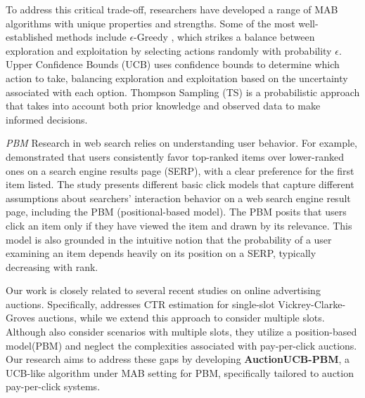 To address this critical trade-off, researchers have developed a range of MAB algorithms with unique properties and strengths. Some of the most well-established methods include $\epsilon$-Greedy \cite{auer2002finite}, which strikes a balance between exploration and exploitation by selecting actions randomly with probability $\epsilon$. Upper Confidence Bounds (UCB) \cite{auer2002using} uses confidence bounds to determine which action to take, balancing exploration and exploitation based on the uncertainty associated with each option. Thompson Sampling (TS) \cite{chapelle2011empirical} is a probabilistic approach that takes into account both prior knowledge and observed data to make informed decisions.

\textit{PBM} Research in web search relies on understanding user behavior. For example, \cite{joachims2017accurately} demonstrated that users consistently favor top-ranked items over lower-ranked ones on a search engine results page (SERP), with a clear preference for the first item listed. The study \cite{chuklin2022click} presents different basic click models that capture different assumptions about searchers' interaction behavior on a web search engine result page, including the PBM (positional-based model). The PBM posits that users click an item only if they have viewed the item and drawn by its relevance. This model is also grounded in the intuitive notion that the probability of a user examining an item depends heavily on its position on a SERP, typically decreasing with rank.

Our work is closely related to several recent studies \cite{zhou2023bandit, lagree2016multiple, feng2023improved} on online advertising auctions. Specifically,  \cite{feng2023improved} addresses CTR estimation for single-slot Vickrey-Clarke-Groves auctions, while we extend this approach to consider multiple slots. Although \cite{lagree2016multiple, zhou2023bandit} also consider scenarios with multiple slots, they utilize a position-based model(PBM) and neglect the complexities associated with pay-per-click auctions. Our research aims to address these gaps by developing \textbf{AuctionUCB-PBM}, a UCB-like algorithm under MAB setting for PBM, specifically tailored to auction pay-per-click systems.
